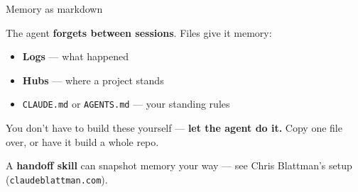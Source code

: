 \documentclass[aspectratio=169, 10pt]{beamer}
\begin{document}
\begin{frame}{Memory as markdown}
\vskip6pt
\begin{tcolorbox}[keybox, title={\faFile\quad Files are how it remembers}, top=3pt, bottom=3pt]
\small
The agent \textbf{forgets between sessions}. Files give it memory:
\vskip3pt
\begin{itemize}\setlength{\itemsep}{2pt}
  \item \textbf{Logs} --- what happened
  \item \textbf{Hubs} --- where a project stands
  \item \texttt{CLAUDE.md} or \texttt{AGENTS.md} --- your standing rules
\end{itemize}
\vskip3pt
You don't have to build these yourself --- \textbf{let the agent do it.} Copy one file over, or have it build a whole repo.
\end{tcolorbox}
\vskip6pt
\begin{tcolorbox}[advancedbox]
\scriptsize A \textbf{handoff skill} can snapshot memory your way --- see Chris Blattman's setup (\texttt{claudeblattman.com}).
\end{tcolorbox}
\end{frame}
%
\end{document}
